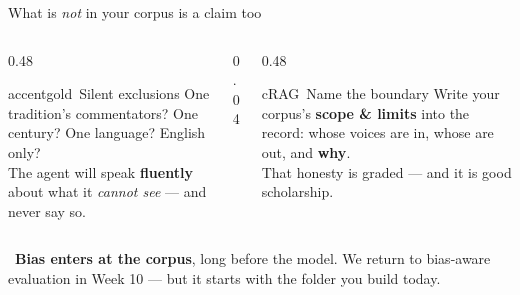\begin{frame}{What is \emph{not} in your corpus is a claim too}
  \begin{columns}[t, totalwidth=\textwidth]
    \begin{column}{0.48\textwidth}
      \begin{featbox}{accentgold}{\faFilter\ Silent exclusions}
        \scriptsize
        One tradition's commentators? One century? One language? English only?
        \\[3pt]The agent will speak \textbf{fluently} about what it \emph{cannot see} ---
        and never say so.
      \end{featbox}
    \end{column}
    \begin{column}{0.04\textwidth}\end{column}
    \begin{column}{0.48\textwidth}
      \begin{featbox}{cRAG}{\faUsers\ Name the boundary}
        \scriptsize
        Write your corpus's \textbf{scope \& limits} into the record: whose voices are
        in, whose are out, and \textbf{why}.
        \\[3pt]That honesty is graded --- and it is good scholarship.
      \end{featbox}
    \end{column}
  \end{columns}
  \vspace{8pt}
  \begin{calloutbox}[labnavy]
    \small\faLightbulb\ \textbf{Bias enters at the corpus}, long before the model. We
    return to bias-aware evaluation in Week 10 --- but it starts with the folder you
    build today.
  \end{calloutbox}
\end{frame}

